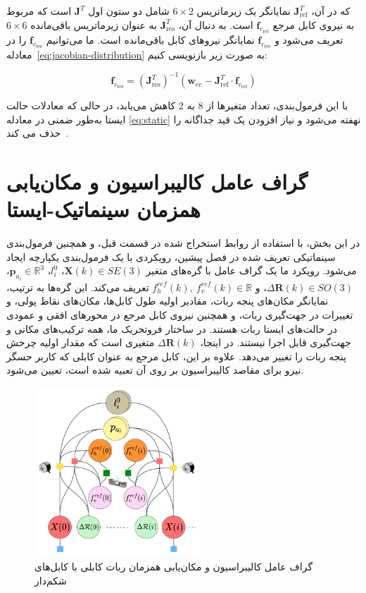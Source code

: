 که در آن، $\bm{J}^T_{\text{ref}}$ نمایانگر یک زیرماتریس $6\times2$ شامل دو ستون اول $\bm{J}^T$ است که مربوط به نیروی کابل مرجع $\mathbf{f}_{c_{\text{ref}}}$ است. به دنبال آن، $\bm{J}^T_{\text{res}}$ به عنوان زیرماتریس باقی‌مانده $6\times6$ تعریف می‌شود و $\mathbf{f}_{c_{\text{res}}}$ نمایانگر نیروهای کابل باقی‌مانده است. ما می‌توانیم $\mathbf{f}_{c_{\text{res}}}$ را در معادله~\eqref{eq:jacobian-distribution} به صورت زیر بازنویسی کنیم:

\begin{equation} \label{eq:force_base_cable_one}
	\mathbf{f}_{c_{\text{res}}} = (\bm{J}_{\text{res}}^T)^{-1} \left( \mathbf{w}_{ee} - \bm{J}_{\text{ref}}^T \cdot \mathbf{f}_{c_{\text{ref}}} \right)
\end{equation}

با این فرمول‌بندی، تعداد متغیرها از 8 به 2 کاهش می‌یابد، در حالی که معادلات حالت ایستا به‌طور ضمنی در معادله \eqref{eq:static} نهفته می‌شود و نیاز افزودن یک قید جداگانه را حذف می کند~\cite{borgstrom2009nims}.




\section{گراف عامل کالیبراسیون و مکان‌یابی همزمان سینماتیک-ایستا} \label{sec:calib_factor}

در این بخش، با استفاده از روابط استخراج شده در قسمت قبل، و همچنین فرمول‌بندی سینماتیکی تعریف شده در فصل پیشین، رویکردی با یک فرمول‌بندی یکپارچه ایجاد می‌شود. رویکرد ما یک گراف عامل با گره‌های متغیر
$\bm{X}(k) \in SE(3)$، $l^0_i$، $\bm{p}_{a_i} \in \mathbb{R}^3$، $\Delta\mathcal{\bm{R}}(k) \in SO(3)$، و $f^{ref}_{h}(k), \ f^{ref}_{v}(k) \in \mathbb{R}$
تعریف می‌کند. این گره‌ها به ترتیب، نمایانگر مکان‌های پنجه ربات، مقادیر اولیه طول کابل‌ها، مکان‌های نقاط پولی، و تغییرات در جهت‌گیری ربات، و همچنین نیروی کابل مرجع در محورهای افقی و عمودی در حالت‌های ایستا ربات هستند. در ساختار فروتحریک ما، همه ترکیب‌های مکانی و جهت‌گیری قابل اجرا نیستند. در اینجا، $\Delta\mathcal{\bm{R}}(k)$ متغیری است که مقدار اولیه چرخش پنجه ربات را تغییر می‌دهد. علاوه بر این، کابل مرجع به عنوان کابلی که کاربر حسگر نیرو برای مقاصد کالیبراسیون بر روی آن تعبیه شده است، تعیین می‌شود.

\begin{figure} [t]
	\centering
	\includegraphics[width=0.55\textwidth]{img/CALIBRATION_GRAPH.pdf}
	\caption{گراف عامل کالیبراسیون و مکان‌یابی همزمان ربات کابلی با کابل‌های شکم‌دار}
	\label{fig:calibration_FG}
\end{figure}

